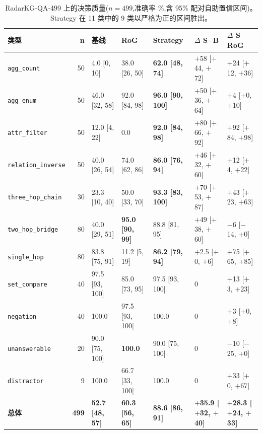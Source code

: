 \documentclass[11pt,a4paper]{article}
\newcommand{\qtype}[1]{\texttt{\small #1}}
\begin{document}
\begin{table}[t]
\centering\small
\caption{RadarKG-QA-499 上的决策质量($n{=}499$,准确率 \%,含 95\% 配对自助置信区间)。Strategy 在 11 类中的 9 类以严格为正的区间胜出。}
\label{tab:main}
\setlength{\tabcolsep}{3.5pt}
\begin{tabular}{l r l l l l l}
\toprule
\textbf{类型} & \textbf{n} & \textbf{基线} & \textbf{RoG} & \textbf{Strategy} & \textbf{$\Delta$ S$-$B} & \textbf{$\Delta$ S$-$RoG} \\
\midrule
\qtype{agg\_count}        & 50 & 4.0 [0, 10] & 38.0 [26, 50] & \textbf{62.0 [48, 74]} & $+$58 [$+$44, $+$72] & $+$24 [$+$12, $+$36] \\
\qtype{agg\_enum}         & 50 & 46.0 [32, 58] & 92.0 [84, 98] & \textbf{96.0 [90, 100]} & $+$50 [$+$36, $+$64] & $+$4 [$+$0, $+$10] \\
\qtype{attr\_filter}      & 50 & 12.0 [4, 22]  & 0.0           & \textbf{92.0 [84, 98]} & $+$80 [$+$66, $+$92] & $+$92 [$+$84, $+$98] \\
\qtype{relation\_inverse} & 50 & 40.0 [26, 54] & 74.0 [62, 86] & \textbf{86.0 [76, 94]} & $+$46 [$+$32, $+$60] & $+$12 [$+$4, $+$22] \\
\qtype{three\_hop\_chain} & 30 & 23.3 [10, 40] & 50.0 [33, 70] & \textbf{93.3 [83, 100]} & $+$70 [$+$53, $+$87] & $+$43 [$+$23, $+$63] \\
\qtype{two\_hop\_bridge}  & 80 & 40.0 [29, 51] & \textbf{95.0 [90, 99]} & 88.8 [81, 95] & $+$49 [$+$38, $+$60] & $-$6 [$-$14, $+$0] \\
\qtype{single\_hop}       & 80 & 83.8 [75, 91] & 11.2 [5, 19]  & \textbf{86.2 [79, 94]} & $+$2.5 [$+$0, $+$6] & $+$75 [$+$65, $+$85] \\
\qtype{set\_compare}      & 40 & 97.5 [93, 100] & 85.0 [73, 95] & 97.5 [93, 100] & 0 & $+$13 [$+$3, $+$23] \\
\qtype{negation}          & 40 & 100.0          & 97.5 [93, 100] & 100.0 & 0 & $+$3 [$+$0, $+$8] \\
\qtype{unanswerable}      & 20 & 90.0 [75, 100] & \textbf{100.0} & 90.0 [75, 100] & 0 & $-$10 [$-$25, $+$0] \\
\qtype{distractor}        & 9  & 100.0          & 66.7 [33, 100] & 100.0 & 0 & $+$33 [$+$0, $+$67] \\
\midrule
\textbf{总体} & \textbf{499} & \textbf{52.7 [48, 57]} & \textbf{60.3 [56, 65]} & \textbf{88.6 [86, 91]} & \textbf{$+$35.9 [$+$32, $+$40]} & \textbf{$+$28.3 [$+$24, $+$33]} \\
\bottomrule
\end{tabular}
\end{table}
\end{document}
